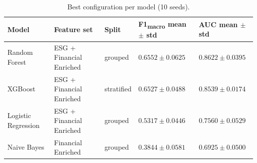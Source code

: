 \begin{table}[htbp]
  \centering
  \caption{Best configuration per model (10 seeds).}
  \label{tab:best_per_model}
  \begin{tabular}{lllll}
    \toprule
    Model & Feature set & Split & F1\textsubscript{macro} mean $\pm$ std & AUC mean $\pm$ std \\
    \midrule
    Random Forest & ESG + Financial Enriched & grouped & $0.6552 \pm 0.0625$ & $0.8622 \pm 0.0395$ \\
    XGBoost & ESG + Financial Enriched & stratified & $0.6527 \pm 0.0488$ & $0.8539 \pm 0.0174$ \\
    Logistic Regression & ESG + Financial Enriched & grouped & $0.5317 \pm 0.0446$ & $0.7560 \pm 0.0529$ \\
    Naive Bayes & Financial Enriched & grouped & $0.3844 \pm 0.0581$ & $0.6925 \pm 0.0500$ \\
    \bottomrule
  \end{tabular}
\end{table}